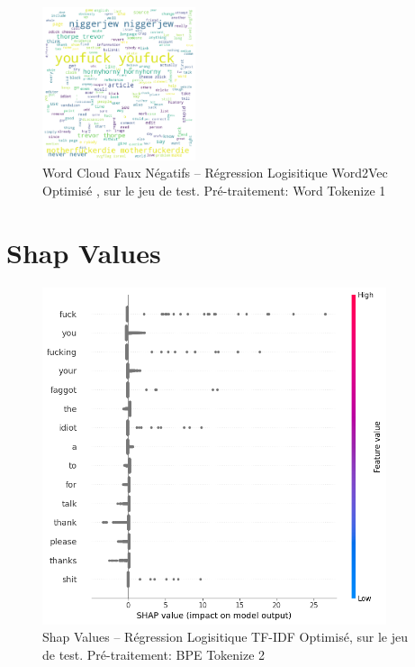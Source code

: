 \begin{figure}[h]
    \centering
    \includegraphics[width=0.4\textwidth]{figures/word-cloud-reg-w2v-fn.png}
    \caption{Word Cloud Faux Négatifs – Régression Logisitique Word2Vec Optimisé , sur le jeu de test. Pré-traitement:  Word Tokenize 1}
\end{figure}

\newpage

\section{Shap Values}
\begin{figure}[h]
    \centering
    \includegraphics[width=0.9\textwidth]{figures/reg-tf-shap.png}
    \caption{Shap Values – Régression Logisitique TF-IDF Optimisé, sur le jeu de test. Pré-traitement: BPE Tokenize 2}
\end{figure}